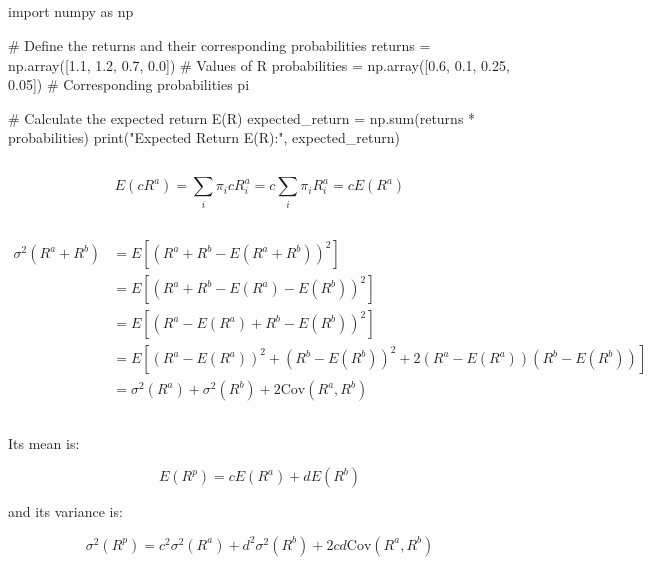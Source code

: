 \subsection{}

\begin{python}
import numpy as np

# Define the returns and their corresponding probabilities
returns = np.array([1.1, 1.2, 0.7, 0.0])  # Values of R
probabilities = np.array([0.6, 0.1, 0.25, 0.05])  # Corresponding probabilities pi

# Calculate the expected return E(R)
expected_return = np.sum(returns * probabilities)
print("Expected Return E(R):", expected_return)
\end{python}


\subsection{}

\begin{equation}
    E(cR^a) = \sum_i \pi_i c R^a_i  = c\sum_i  \pi_i R^a_i = cE(R^a)
\end{equation}

\subsection{}

\begin{align}
    \sigma^2(R^a + R^b) &= E[(R^a + R^b - E(R^a + R^b))^2] \\
    &= E[(R^a + R^b - E(R^a) - E(R^b))^2] \\
    &= E[(R^a - E(R^a) + R^b - E(R^b))^2] \\
    &= E[(R^a - E(R^a))^2 + (R^b - E(R^b))^2 + 2(R^a - E(R^a))(R^b - E(R^b))] \\
    &= \sigma^2(R^a) + \sigma^2(R^b) + 2\text{Cov}(R^a, R^b)
\end{align}

\subsection{}

Its mean is:

\begin{equation}
    E(R^p) = cE(R^a) + dE(R^b)
\end{equation}

and its variance is:

\begin{equation}
    \sigma^2(R^p) = c^2\sigma^2(R^a) + d^2\sigma^2(R^b) + 2cd\text{Cov}(R^a, R^b)
\end{equation}
